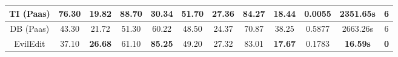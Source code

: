 \begin{table*}[htbp]
{\begin{tabular}{|c|cccc|ccccc|cc|}
TI (Paas)                                                           & \multicolumn{1}{c|}{76.30}                     & \multicolumn{1}{c|}{19.82}          & \multicolumn{1}{c|}{88.70}                     & 30.34                     & \multicolumn{1}{c|}{51.70}                     & \multicolumn{1}{c|}{\textbf{27.36}} & \multicolumn{1}{c|}{\textbf{84.27}}            & \multicolumn{1}{c|}{18.44}          & \textbf{0.0055} & \multicolumn{1}{c|}{2351.65s}        & 6          \\ \hline
DB (Paas)                                                           & \multicolumn{1}{c|}{43.30}                     & \multicolumn{1}{c|}{21.72}          & \multicolumn{1}{c|}{51.30}                     & 60.22                     & \multicolumn{1}{c|}{48.50}                     & \multicolumn{1}{c|}{24.37}          & \multicolumn{1}{c|}{70.87}                     & \multicolumn{1}{c|}{38.25}          & 0.5877          & \multicolumn{1}{c|}{2663.26s}        & 6          \\ \hline
EvilEdit                                                            & \multicolumn{1}{c|}{37.10}                     & \multicolumn{1}{c|}{\textbf{26.68}} & \multicolumn{1}{c|}{61.10}                     & \textbf{85.25}            & \multicolumn{1}{c|}{49.20}                     & \multicolumn{1}{c|}{27.32}          & \multicolumn{1}{c|}{83.01}                     & \multicolumn{1}{c|}{\textbf{17.67}} & 0.1783          & \multicolumn{1}{c|}{\textbf{16.59s}} & \textbf{0} \\ \hline
\end{tabular}}
\end{table*}

